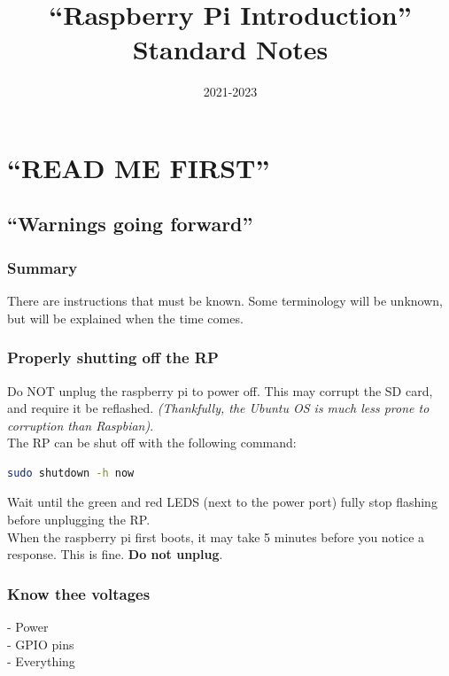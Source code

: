 \documentclass[a4paper, 10pt]{article}
\title{``Raspberry Pi Introduction'' Standard Notes}
\date{2021-2023}
\begin{document}
\maketitle

\pagebreak

\tableofcontents

 \pagebreak

\section{``READ ME FIRST''}
	\subsection*{``Warnings going forward''}
		\subsubsection*{Summary}
		There are instructions that must be known. Some terminology will be unknown, but will be explained when the time comes. 
	
		\subsubsection{Properly shutting off the RP}
            Do NOT unplug the raspberry pi to power off. This may corrupt the SD card, and require it be reflashed. 
            \textit{(Thankfully, the Ubuntu OS is much less prone to corruption than Raspbian)}.\\

            The RP can be shut off with the following command:
            \begin{lstlisting}[language=bash]
                sudo shutdown -h now
            \end{lstlisting}       
            Wait until the green and red LEDS (next to the power port) fully stop flashing before unplugging the RP.\\

            When the raspberry pi first boots, it may take 5 minutes before you notice a response. This is fine. \textbf{Do not unplug}.

		\subsubsection{Know thee voltages}
            - Power\\
            - GPIO pins\\
            - Everything\\
\end{document}
